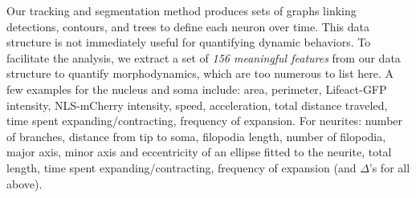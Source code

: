 \vspace{-3mm} Our  tracking and  segmentation method produces  sets of
graphs linking  detections, contours, and trees to  define each neuron
over  time.  This  data   structure  is  not  immediately  useful  for
quantifying dynamic behaviors.  To facilitate the analysis, we extract
a  set of {\em  156 meaningful  features} from  our data  structure to
quantify morphodynamics, which  are too numerous to list  here.  A few
examples  for   the  nucleus   and  soma  include:   area,  perimeter,
Lifeact-GFP  intensity,  NLS-mCherry  intensity, speed,  acceleration,
total distance  traveled, time spent  expanding/contracting, frequency
of expansion.  For neurites: number  of branches, distance from tip to
soma, filopodia  length, number of  filopodia, major axis,  minor axis
and eccentricity of an ellipse fitted to the neurite, total length, time
spent expanding/contracting, frequency of expansion (and
$\Delta$'s for all above).

